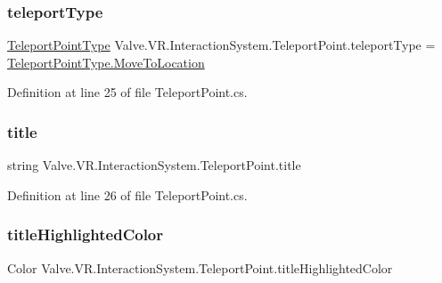 \subsubsection{\texorpdfstring{teleportType}{teleportType}}
{\footnotesize\ttfamily \mbox{\hyperlink{class_valve_1_1_v_r_1_1_interaction_system_1_1_teleport_point_a1a849ffcc7eea342470d494523085b57}{Teleport\+Point\+Type}} Valve.\+V\+R.\+Interaction\+System.\+Teleport\+Point.\+teleport\+Type = \mbox{\hyperlink{class_valve_1_1_v_r_1_1_interaction_system_1_1_teleport_point_a1a849ffcc7eea342470d494523085b57a16808f36574d3edac6f7fee3ac10dd28}{Teleport\+Point\+Type.\+Move\+To\+Location}}}



Definition at line 25 of file Teleport\+Point.\+cs.

\mbox{\label{class_valve_1_1_v_r_1_1_interaction_system_1_1_teleport_point_add0bb364d611e45c9fb8595dcbcb50b5}} 
\subsubsection{\texorpdfstring{title}{title}}
{\footnotesize\ttfamily string Valve.\+V\+R.\+Interaction\+System.\+Teleport\+Point.\+title}



Definition at line 26 of file Teleport\+Point.\+cs.

\mbox{\label{class_valve_1_1_v_r_1_1_interaction_system_1_1_teleport_point_ab7ad6e57d737fe2b6de74239bc65b0ae}} 
\subsubsection{\texorpdfstring{titleHighlightedColor}{titleHighlightedColor}}
{\footnotesize\ttfamily Color Valve.\+V\+R.\+Interaction\+System.\+Teleport\+Point.\+title\+Highlighted\+Color}



